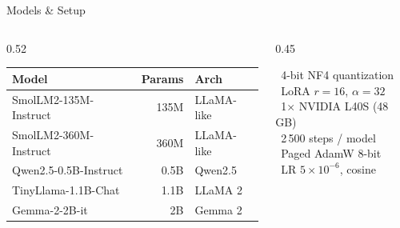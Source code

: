 \documentclass[10pt, aspectratio=169]{beamer}
\begin{document}
\begin{frame}{Models \& Setup}
  \begin{columns}[T]
    \begin{column}{0.52\textwidth}
      \renewcommand{\arraystretch}{1.4}
      \centering
      \footnotesize
      \begin{tabular}{@{}lrl@{}}
        \toprule
        \textbf{Model}         & \textbf{Params} & \textbf{Arch} \\
        \midrule
        SmolLM2-135M-Instruct  & 135M & LLaMA-like \\
        SmolLM2-360M-Instruct  & 360M & LLaMA-like \\
        Qwen2.5-0.5B-Instruct  & 0.5B & Qwen2.5 \\
        TinyLlama-1.1B-Chat    & 1.1B & LLaMA 2 \\
        Gemma-2-2B-it          &   2B & Gemma 2 \\
        \bottomrule
      \end{tabular}
    \end{column}
    \begin{column}{0.45\textwidth}
      \vspace{0.2em}
      \begin{tcolorbox}[insightbox=navy, title=Configuration]
        \small
        \textcolor{sky}{\faHdd}~4-bit NF4 quantization\\[0.35em]
        \textcolor{sky}{\faSitemap}~LoRA $r{=}16$,\; $\alpha{=}32$\\[0.35em]
        \textcolor{sky}{\faMicrochip}~1$\times$ NVIDIA L40S (48\,GB)\\[0.35em]
        \textcolor{sky}{\faRedo}~2\,500 steps / model\\[0.35em]
        \textcolor{sky}{\faCog}~Paged AdamW 8-bit\\[0.35em]
        \textcolor{sky}{\faGraduationCap}~LR $5{\times}10^{-6}$, cosine
      \end{tcolorbox}
    \end{column}
  \end{columns}
\end{frame}
\end{document}
